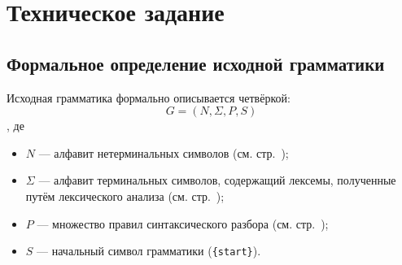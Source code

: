 \documentclass[a4paper,10pt,notitlepage,pdftex]{scrreprt}
\begin{document}
\chapter{Техническое задание}
\label{chap:second}
    \section{Формальное определение исходной грамматики}
    \label{sec:formal}
        Исходная грамматика формально описывается четвёркой:
        \begin{equation}
            \label{eq:grammar}
            G = \left( N, \Sigma, P, S \right)
        \end{equation}
        , де
        \begin{itemize}
            \item $N$ --- алфавит нетерминальных символов (см. стр.~\pageref{para:nonterm});
            \item $\Sigma$ --- алфавит терминальных символов, содержащий лексемы, полученные путём лексического
                анализа (см. стр.~\pageref{para:term});
            \item $P$ --- множество правил синтаксического разбора (см. стр.~\pageref{para:rules});
            \item $S$ --- начальный символ грамматики (\verb'{start}').
        \end{itemize}
\end{document}
